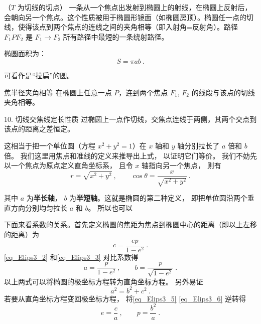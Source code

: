 （$T$ 为切线的切点）
一条从一个焦点出发射到椭圆上的射线，在椭圆上反射后，会朝向另一个焦点。这个性质被用于椭圆形镜面（如椭圆房顶）。椭圆任一点的切线，使得该点到两个焦点的连线之间的夹角相等（即入射角=反射角）。路径 $F_1PF_2$ 是 $F_1 \to F_2$ 所有路径中最短的一条绕射路径。

椭圆面积为：
\begin{equation}
S = \pi a b~.
\end{equation}

可看作是“拉扁”的圆。

焦半径夹角相等
在椭圆上任意一点 $P$，连到两个焦点 $F_1$, $F_2$ 的线段与该点的切线夹角相等。

	10.	切线交焦线定长性质
过椭圆上一点作切线，交焦点连线于两侧，其两个交点到该点的距离之差恒定。



这相当于把一个单位圆（方程 $x^2 + y^2 = 1$）在 $x$ 轴和 $y$ 轴分别拉长了 $a$ 倍和 $b$ 倍。 我们这里用焦点和准线的定义来推导出上式， 以证明它们等价。 我们不妨先以一个焦点为原点定义直角坐标系， 且令 $x$ 轴指向另一个焦点， 则有
\begin{equation}
r = \sqrt{x^2 + y^2}~, \qquad \cos\theta = \frac{x}{\sqrt{x^2 + y^2}}~.
\end{equation}

其中 $a$ 为\textbf{半长轴}， $b$ 为\textbf{半短轴}。这就是椭圆的第二种定义， 即把单位圆沿两个垂直方向分别均匀拉长 $a$ 和 $b$。 所以也可以


下面来看系数的关系。首先定义椭圆的焦距为焦点到椭圆中心的距离（即以上左移的距离）为
\begin{equation}\label{eq_Elips3_5}
c = \frac{ep}{1 - e^2}~.
\end{equation}
\autoref{eq_Elips3_2} 和\autoref{eq_Elips3_3} 对比系数得
\begin{equation}\label{eq_Elips3_6}
a = \frac{p}{1 - e^2}~, \qquad b = \frac{p}{\sqrt {1 - e^2} }~.
\end{equation}
以上两式可以将椭圆的极坐标方程转为直角坐标方程。 另外易证
\begin{equation}\label{eq_Elips3_7}
a^2 = b^2 + c^2~.
\end{equation}
若要从直角坐标方程变回极坐标方程， 将\autoref{eq_Elips3_5} \autoref{eq_Elips3_6} 逆转得
\begin{equation}\label{eq_Elips3_8}
e = \frac{c}{a}~,\qquad
p = \frac{b^2}{a}~.
\end{equation}



